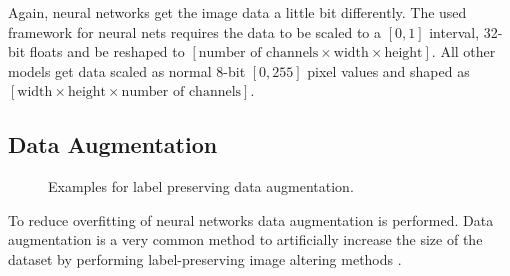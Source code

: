 Again, neural networks get the image data a little bit differently. The used framework for neural nets requires the data to be scaled to a $[0,1]$ interval, 32-bit floats and be reshaped to $[\text{number of channels} \times \text{width} \times \text{height}]$. All other models get data scaled as normal 8-bit $[0,255]$ pixel values and shaped as $[\text{width} \times \text{height} \times \text{number of channels}]$.

\subsection*{Data Augmentation}
\label{subsec:dataAugmentation}
\begin{figure}[htb]
	\centering
	\hspace{\fill}%
	\hspace{\fill}%
	\hspace{\fill}%
	\hspace{\fill}%
	\hspace{\fill}%
	
	\caption{Examples for label preserving data augmentation.}
	\label{fig:dataAugmentation}
\end{figure}
To reduce overfitting of neural networks data augmentation is performed. Data augmentation is a very common method to artificially increase the size of the dataset by performing label-preserving image altering methods \cite{Dosovitskiy2013, Krizhevsky2012, Christodoulidis2015}. 
	
